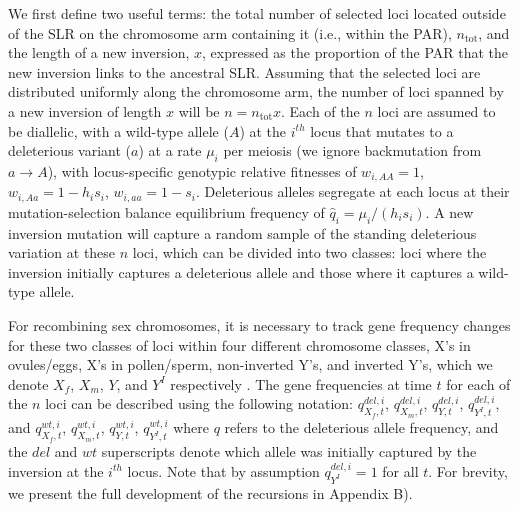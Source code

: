 \documentclass[11pt]{article}
\begin{document}
We first define two useful terms: the total number of selected loci located outside of the SLR on the chromosome arm containing it (i.e., within the PAR), $n_{\text{tot}}$, and the length of a new inversion, $x$, expressed as the proportion of the PAR that the new inversion links to the ancestral SLR. Assuming that the selected loci are distributed uniformly along the chromosome arm, the number of loci spanned by a new inversion of length $x$ will be $n = n_{\text{tot}} x$. Each of the $n$ loci are assumed to be diallelic, with a wild-type allele ($A$) at the $i^{th}$ locus that mutates to a deleterious variant ($a$) at a rate $\mu_i$ per meiosis (we ignore backmutation from $a \rightarrow A$), with locus-specific genotypic relative fitnesses of $w_{i,AA} = 1$, $w_{i,Aa} = 1 - h_i s_i$, $w_{i,aa} = 1 - s_i$. Deleterious alleles segregate at each locus at their mutation-selection balance equilibrium frequency of $\hat{q}_i = \mu_i/(h_i s_i)$. A new inversion mutation will capture a random sample of the standing deleterious variation at these $n$ loci, which can be divided into two classes: loci where the inversion initially captures a deleterious allele and those where it captures a wild-type allele.

For recombining sex chromosomes, it is necessary to track gene frequency changes for these two classes of loci within four different chromosome classes, X’s in ovules/eggs, X’s in pollen/sperm, non-inverted Y’s, and inverted Y’s, which we denote $X_f$, $X_m$, $Y$, and $Y^I$ respectively \citep[see][]{Otto2014,OlitoAbbott2020}. The gene frequencies at time $t$ for each of the $n$ loci can be described using the following notation: $q_{X_f,t}^{del,i}$, $q_{X_m,t}^{del,i}$, $q_{Y,t}^{del,i}$, $q_{Y^I,t}^{del,i}$, and $q_{X_f,t}^{wt,i}$, $q_{X_m,t}^{wt,i}$, $q_{Y,t}^{wt,i}$, $q_{Y^I,t}^{wt,i}$ where $q$ refers to the deleterious allele frequency, and the $del$ and $wt$ superscripts denote which allele was initially captured by the inversion at the $i^{th}$ locus. Note that by assumption $q_{Y^I}^{del,i} = 1$ for all $t$. For brevity, we present the full development of the recursions in Appendix B).
\end{document}
